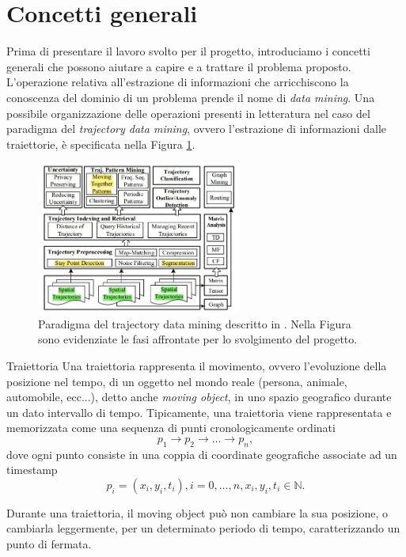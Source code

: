 \documentclass[12pt]{article}
\begin{document}
\section{Concetti generali}
Prima di presentare il lavoro svolto per il progetto, introduciamo i concetti generali che possono aiutare a capire e a trattare il problema proposto.\\
L’operazione relativa all’estrazione di informazioni che arricchiscono la conoscenza
del dominio di un problema prende il nome di \emph{data mining}. Una possibile
organizzazione delle operazioni presenti in letteratura nel caso del paradigma del \emph{trajectory data mining}, ovvero l'estrazione di informazioni dalle traiettorie, è specificata nella Figura \ref{trajectorydatamining}.
\begin{figure}
    \centering
    \includegraphics[width=0.6\textwidth]{images/datamining.jpg}
    \caption{Paradigma del trajectory data mining descritto in \cite{TrajectoryDataMining}. Nella Figura sono evidenziate le fasi affrontate per lo svolgimento del progetto.}
    \label{trajectorydatamining}
\end{figure}
\begin{definition}{Traiettoria}{}
    Una traiettoria rappresenta il movimento, ovvero l'evoluzione della posizione nel tempo, di un oggetto nel mondo reale (persona, animale, automobile, ecc...), detto anche \emph{moving object}, in uno spazio geografico durante un dato intervallo di tempo.
    Tipicamente, una traiettoria viene rappresentata e memorizzata come una sequenza di punti cronologicamente ordinati $$p_1 \rightarrow p_2 \rightarrow \dots \rightarrow p_n,$$ dove ogni punto consiste in una coppia di coordinate geografiche associate ad un timestamp $$p_i=(x_i,y_i,t_i), i=0,\dots,n,x_i,y_i,t_i \in \mathbb{N}.$$
\end{definition}
Durante una traiettoria, il moving object può non cambiare la sua posizione, o cambiarla leggermente, per un determinato periodo di tempo, caratterizzando un punto di fermata.
\end{document}

